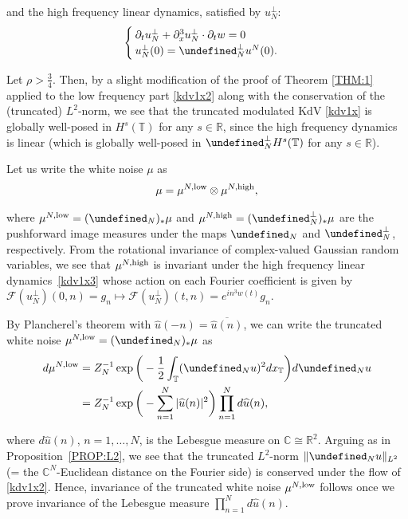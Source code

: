 \documentclass[letterpaper, 11pt,  reqno]{amsart}
\newcommand{\1}{\hspace{0.5mm}\text{I}\hspace{0.5mm}}
\newcommand{\noi}{\noindent}
\newcommand{\R}{\mathbb{R}}
\newcommand{\C}{\mathbb{C}}
\newcommand{\T}{\mathbb{T}}
\let\P= \undefined
\newcommand{\P}{\mathbf{P}}
\newcommand{\F}{\mathcal{F}}
\newcommand{\low}{\textup{low}}
\newcommand{\high}{\textup{high}}
\newcommand{\ft}{\widehat}
\newcommand{\cj}{\overline}
\newcommand{\dx}{\partial_x}
\newcommand{\dt}{\partial_t}
\numberwithin{equation}{section}
\numberwithin{theorem}{section}
\begin{document}
\noi
and the high frequency linear dynamics, 
satisfied by $u_N^\perp$:
\begin{equation}
\begin{cases}
\dt u_N^\perp+  \dx^3 u_N^\perp \cdot \dt w = 0 \\
u_N^\perp(0) = \P_N^\perp u^N(0).
\end{cases}
\label{kdv1x3}
\end{equation}




\noi
Let $\rho > \frac 34$.
Then, by a slight modification of the proof of Theorem \ref{THM:1}
applied to the low frequency part \eqref{kdv1x2}
along with the conservation of the (truncated) $L^2$-norm, 
we see that 
the truncated modulated KdV \eqref{kdv1x}
is globally well-posed in $H^s(\T)$ for any $s \in \R$,
since the high frequency dynamics is linear
(which is globally well-posed in $\P_N^\perp H^s(\T)$ for any $s \in \R$).


Let us write the white noise $\mu$ as 
\begin{align}
 \mu 
  =  \mu^{N, \low} \otimes \mu^{N, \high}, 
\label{white1b}
\end{align}

\noi
where $\mu^{N, \low} = (\P_N)_* \mu$
and  $\mu^{N, \high} = (\P_N^\perp)_* \mu$
are the pushforward image
measures under the maps $\P_N$ and $\P_N^\perp$, 
respectively.
From the rotational invariance of complex-valued Gaussian random variables, we see that 
 $\mu^{N, \high}$ is invariant
under the high frequency linear dynamics~\eqref{kdv1x3}
whose action on each Fourier coefficient is given by 
$\F(u_N^\perp)(0, n) = g_n \mapsto  \F(u_N^\perp)(t, n) = e^{i n^3 w(t)}g_n$.


By Plancherel's theorem with $\ft u(-n) = \cj{\ft u(n)}$, 
we can write  the truncated white noise $\mu^{N, \low} = (\P_N)_*\mu$ as
\begin{align*}
d\mu^{N, \low}
& = Z_N^{-1}
\exp\bigg(- \frac 12 \int_\T (\P_N u)^2 dx_\T\bigg) d\P_N u\\
& = Z_N^{-1}
\exp\bigg(- \sum_{n = 1}^N |\ft u(n)|^2 \bigg) \prod_{n = 1}^N d\ft u(n), 
\end{align*}

\noi
where $d\ft u(n)$, $n = 1, \dots, N$, is the Lebesgue measure on $\C\cong \R^2$.
Arguing as in 
Proposition~\ref{PROP:L2}, 
we see that the truncated $L^2$-norm
$\|\P_N u\|_{L^2}$ 
(= the $\C^N$-Euclidean distance on the Fourier side)
is conserved under the flow of \eqref{kdv1x2}.
Hence, invariance of the truncated white noise 
$\mu^{N, \low}$ follows once we prove invariance of the Lebesgue measure
$\prod_{n = 1}^N d\ft u(n)$.
\end{document}
